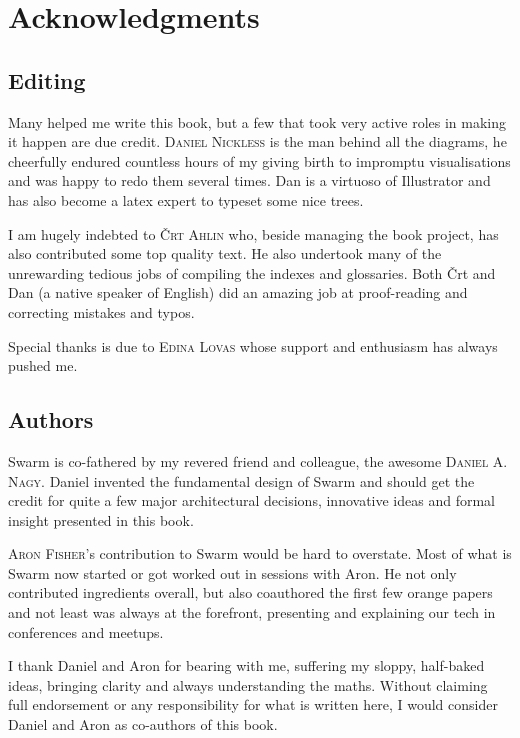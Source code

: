 \newcommand{\person}[1]{{\scshape #1}}
\chapter{Acknowledgments \statusgreen}

\section*{Editing}

Many helped me write this book, but a few that took very active roles in making it happen are due credit. \person{Daniel Nickless} is the man behind all the diagrams, he cheerfully endured countless hours of my giving birth to impromptu visualisations and was happy to redo them several times. Dan is a virtuoso of Illustrator and has also become a latex expert to typeset some nice trees. 

I am hugely indebted to \person{Črt Ahlin} who, beside managing the book project, has also contributed some top quality text.
He also undertook many of the unrewarding tedious jobs of compiling the indexes and glossaries. Both Črt and Dan (a native speaker of English) did an amazing job at proof-reading and correcting mistakes and typos.

Special thanks is due to \person{Edina Lovas} whose support and enthusiasm has always pushed me. 

\section*{Authors}

Swarm is co-fathered by my revered friend and colleague, the awesome \person{Daniel A. Nagy}.  Daniel invented the fundamental design of Swarm and should get the credit for quite a few major architectural decisions, innovative ideas and formal insight presented in this book. 

\person{Aron Fisher}'s contribution to Swarm would be hard to overstate. Most of what is Swarm now started or got worked out in sessions with Aron.  He not only contributed ingredients overall, but also coauthored the first few orange papers and not  least was always at the forefront, presenting and explaining our tech in conferences and meetups.

I thank Daniel and Aron for bearing with me, suffering my sloppy, half-baked ideas, bringing clarity and always understanding the maths.
Without claiming full endorsement or any responsibility for what is written here,
I would consider Daniel and Aron as co-authors of this book.

